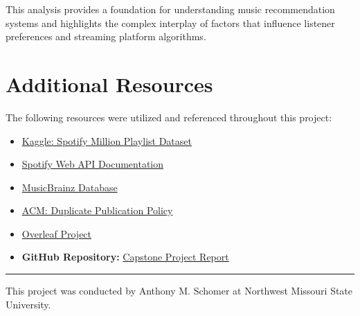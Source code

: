 \documentclass[runningheads]{llncs}
\begin{document}
This analysis provides a foundation for understanding music recommendation systems and highlights the complex interplay of factors that influence listener preferences and streaming platform algorithms.

\section{Additional Resources}
The following resources were utilized and referenced throughout this project:

\begin{itemize}
    \item \href{https://www.kaggle.com/datasets/shubhendra/million-playlist-dataset}{Kaggle: Spotify Million Playlist Dataset}
    \item \href{https://developer.spotify.com/documentation/web-api/}{Spotify Web API Documentation}
    \item \href{https://musicbrainz.org/}{MusicBrainz Database}
    \item \href{https://www.acm.org/publications/policies/duplicate-publication}{ACM: Duplicate Publication Policy}
    \item \href{https://www.overleaf.com/project}{Overleaf Project}
    \item \textbf{GitHub Repository:} \href{https://github.com/anythonyschomer/Capstone-Project-Report}{Capstone Project Report}
\end{itemize}

\vspace{-1em} %
\rule{\textwidth}{0.4pt} %
\vspace{-0.5em} %
This project was conducted by Anthony M. Schomer at Northwest Missouri State University.
\end{document}

